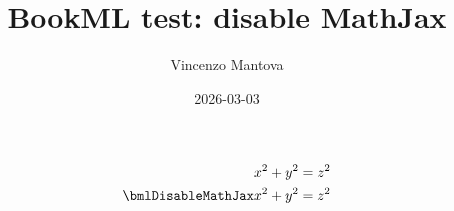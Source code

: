 \documentclass{article}
\title{BookML test: disable MathJax}
\author{Vincenzo Mantova}
\date{2026-03-03}
\begin{document}
\begin{align}
  x^2 + y^2 &= z^2 \\
  \bmlDisableMathJax x^2 + y^2 &= z^2
\end{align}
\end{document}
